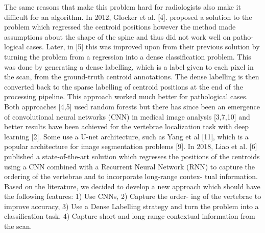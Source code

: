 The same reasons that make this problem hard for radiologists also make it difficult for an algorithm. In 2012, Glocker et al. [4]. proposed a solution to the problem which regressed the centroid positions however the method made assumptions about the shape of the spine and thus did not work well on patho- logical cases. Later, in [5] this was improved upon from their previous solution by turning the problem from a regression into a dense classification problem. This was done by generating a dense labelling, which is a label given to each pixel in the scan, from the ground-truth centroid annotations. The dense labelling is then converted back to the sparse labelling of centroid positions at the end of the processing pipeline. This approach worked much better for pathological cases. Both approaches [4,5] used random forests but there has since been an emergence of convolutional neural networks (CNN) in medical image analysis [3,7,10] and better results have been achieved for the vertebrae localization task with deep learning [2]. Some use a U-net architecture, such as Yang et al [11], which is a popular architecture for image segmentation problems [9]. In 2018, Liao et al. [6] published a state-of-the-art solution which regresses the positions of the centroids using a CNN combined with a Recurrent Neural Network (RNN) to capture the ordering of the vertebrae and to incorporate long-range contex- tual information. Based on the literature, we decided to develop a new approach which should have the following features: 1) Use CNNs, 2) Capture the order- ing of the vertebrae to improve accuracy, 3) Use a Dense Labelling strategy and turn the problem into a classification task, 4) Capture short and long-range contextual information from the scan.
